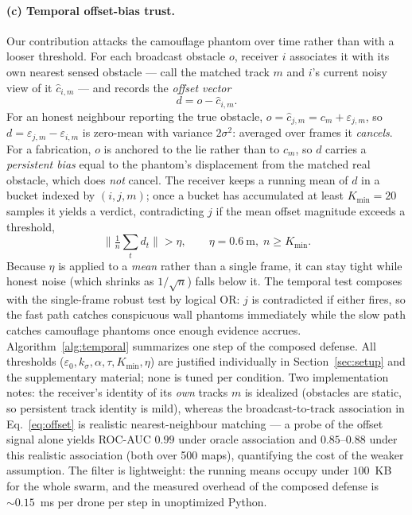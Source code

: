 \paragraph{(c) Temporal offset-bias trust.}
Our contribution attacks the camouflage phantom over time rather than with a
looser threshold. For each broadcast obstacle $o$, receiver $i$ associates
it with its own nearest sensed obstacle --- call the matched track $m$ and
$i$'s current noisy view of it $\hat{c}_{i,m}$ --- and records the
\emph{offset vector}
\begin{equation}
d = o - \hat{c}_{i,m}.
\label{eq:offset}
\end{equation}
For an honest neighbour reporting the true obstacle,
$o=\hat{c}_{j,m}=c_m+\varepsilon_{j,m}$, so
$d=\varepsilon_{j,m}-\varepsilon_{i,m}$ is zero-mean with variance
$2\sigma^2$: averaged over frames it \emph{cancels}. For a fabrication,
$o$ is anchored to the lie rather than to $c_m$, so $d$ carries a
\emph{persistent bias} equal to the phantom's displacement from the matched
real obstacle, which does \emph{not} cancel. The receiver keeps a running
mean of $d$ in a bucket indexed by $(i,j,m)$; once a bucket has accumulated
at least $K_{\min}=20$ samples it yields a verdict, contradicting $j$ if the
mean offset magnitude exceeds a threshold,
\begin{equation}
\Big\lVert\tfrac{1}{n}\textstyle\sum_{t} d_t\Big\rVert > \eta,
\qquad \eta=0.6~\text{m},\; n\ge K_{\min}.
\label{eq:temporal}
\end{equation}
Because $\eta$ is applied to a \emph{mean} rather than a single frame, it can
stay tight while honest noise (which shrinks as $1/\sqrt{n}$) falls below it.
The temporal test composes with the single-frame robust test by logical OR:
$j$ is contradicted if either fires, so the fast path catches conspicuous
wall phantoms immediately while the slow path catches camouflage phantoms
once enough evidence accrues. Algorithm~\ref{alg:temporal} summarizes one
step of the composed defense. All thresholds
($\varepsilon_0,k_\sigma,\alpha,\tau,K_{\min},\eta$) are justified
individually in Section~\ref{sec:setup} and the supplementary material; none
is tuned per condition. Two implementation notes: the receiver's identity of
its \emph{own} tracks $m$ is idealized (obstacles are static, so persistent
track identity is mild), whereas the broadcast-to-track association in
Eq.~\eqref{eq:offset} is realistic nearest-neighbour matching --- a probe of
the offset signal alone yields ROC-AUC $0.99$ under oracle association and
$0.85$--$0.88$ under this realistic association (both over 500 maps),
quantifying the cost of the weaker assumption. The filter is lightweight: the running means occupy under
$100$~KB for the whole swarm, and the measured overhead of the composed
defense is ${\sim}0.15$~ms per drone per step in unoptimized Python.

